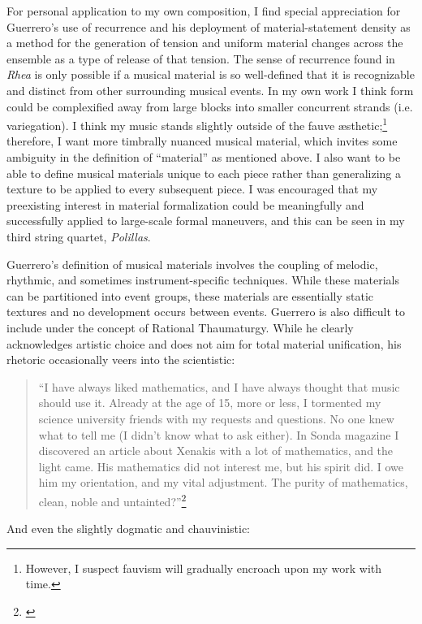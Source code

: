 For personal application to my own composition, I find special appreciation for Guerrero's use of recurrence and his deployment of material-statement density as a method for the generation of tension and uniform material changes across the ensemble as a type of release of that tension. The sense of recurrence found in \textit{Rhea} is only possible if a musical material is so well-defined that it is recognizable and distinct from other surrounding musical events. In my own work I think form could be complexified away from large blocks into smaller concurrent strands (i.e. variegation). I think my music stands slightly outside of the fauve æsthetic;\footnote{However, I suspect fauvism will gradually encroach upon my work with time.} therefore, I want more timbrally nuanced musical material, which invites some ambiguity in the definition of ``material'' as mentioned above. I also want to be able to define musical materials unique to each piece rather than generalizing a texture to be applied to every subsequent piece. I was encouraged that my preexisting interest in material formalization could be meaningfully and successfully applied to large-scale formal maneuvers, and this can be seen in my third string quartet, \textit{Polillas}.

Guerrero's definition of musical materials involves the coupling of melodic, rhythmic, and sometimes instrument-specific techniques. While these materials can be partitioned into event groups, these materials are essentially static textures and no development occurs between events. Guerrero is also difficult to include under the concept of Rational Thaumaturgy. While he clearly acknowledges artistic choice and does not aim for total material unification, his rhetoric occasionally veers into the scientistic:
\begin{quote}
    \singlespacing
    ``I have always liked mathematics, and I have always thought that music should use it. Already at the age of 15, more or less, I tormented my science university friends with my requests and questions. No one knew what to tell me (I didn't know what to ask either). In Sonda magazine I discovered an article about Xenakis with a lot of mathematics, and the light came. His mathematics did not interest me, but his spirit did. I owe him my orientation, and my vital adjustment. The purity of mathematics, clean, noble and untainted?''\footnote{\citet[174]{guerrero-quote}}
\end{quote}

And even the slightly dogmatic and chauvinistic:

